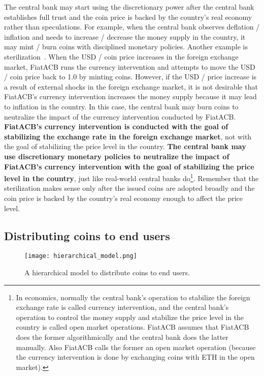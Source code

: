 \documentclass[dvipdfmx,a4paper]{article}
\begin{document}
The central bank may start using the discretionary power after the central bank establishes full trust and the coin price is backed by the country's real economy rather than speculations. For example, when the central bank observes deflation / inflation and needs to increase / decrease the money supply in the country, it may mint / burn coins with disciplined monetary policies. Another example is sterilization~\cite{aizenman2009sterilization}. When the USD / coin price increases in the foreign exchange market, FiatACB runs the currency intervention and attempts to move the USD / coin price back to 1.0 by minting coins. However, if the USD / price increase is a result of external shocks in the foreign exchange market, it is not desirable that FiatACB's currency intervention increases the money supply because it may lead to inflation in the country. In this case, the central bank may burn coins to neutralize the impact of the currency intervention conducted by FiatACB. \textbf{FiatACB's currency intervention is conducted with the goal of stabilizing the exchange rate in the foreign exchange market}, not with the goal of stabilizing the price level in the country. \textbf{The central bank may use discretionary monetary policies to neutralize the impact of FiatACB's currency intervention with the goal of stabilizing the price level in the country}, just like real-world central banks do\footnote{In economics, normally the central bank's operation to stabilize the foreign exchange rate is called currency intervention, and the central bank's operation to control the money supply and stabilize the price level in the country is called open market operations. FiatACB assumes that FiatACB does the former algorithmically and the central bank does the latter manually. Also FiatACB calls the former an open market operation (because the currency intervention is done by exchanging coins with ETH in the open market).}. Remember that the sterilization makes sense only after the issued coins are adopted broadly and the coin price is backed by the country's real economy enough to affect the price level.

\subsection{Distributing coins to end users}

\begin{figure}[tb]
\centering
\texttt{[image: hierarchical\_model.png]}
\caption{A hierarchical model to distribute coins to end users.}
\label{hierarchical_model}
\end{figure}
\end{document}
